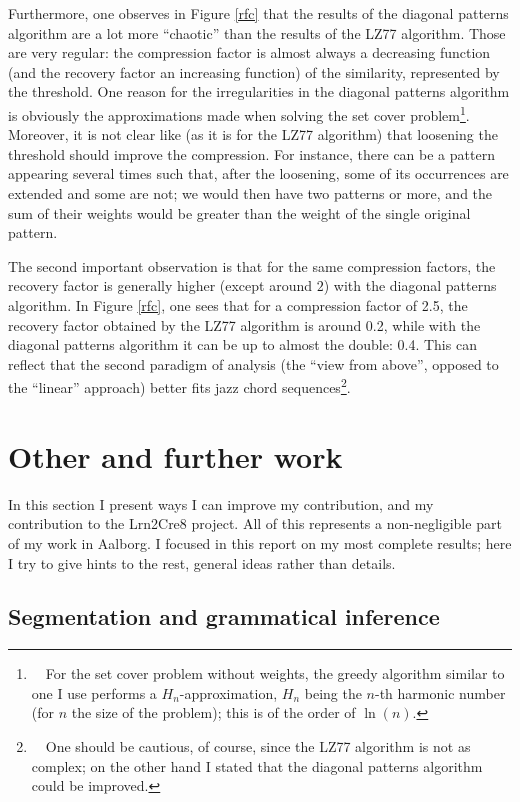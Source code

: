 \documentclass[a4paper,10pt]{article}
\newcommand{\guill}[1]{“#1”}
\begin{document}
Furthermore, one observes in Figure \ref{rfc} that the results of the diagonal patterns algorithm are a lot more \guill{chaotic} than the results of the LZ77 algorithm. Those are very regular: the compression factor is almost always a decreasing function (and the recovery factor an increasing function) of the similarity, represented by the threshold. One reason for the irregularities in the diagonal patterns algorithm is obviously the approximations made when solving the set cover problem\footnote{~~For the set cover problem without weights, the greedy algorithm similar to one I use performs a $H_n$-approximation, $H_n$ being the $n$-th harmonic number (for $n$ the size of the problem); this is of the order of $\ln(n)$.}.
Moreover, it is not clear like (as it is for the LZ77 algorithm) that loosening the threshold should improve the compression. For instance, there can be a pattern appearing several times such that, after the loosening, some of its occurrences are extended and some are not; we would then have two patterns or more, and the sum of their weights would be greater than the weight of the single original pattern.

The second important observation is that for the same compression factors, the recovery factor is generally higher (except around $2$) with the diagonal patterns algorithm. In Figure \ref{rfc}, one sees that for a compression factor of 2.5, the recovery factor obtained by the LZ77 algorithm is around 0.2, while with the diagonal patterns algorithm it can be up to almost the double: 0.4. This can reflect that the second paradigm of analysis (the \guill{view from above}, opposed to the \guill{linear} approach) better fits jazz chord sequences\footnote{~~One should be cautious, of course, since the LZ77 algorithm is not as complex; on the other hand I stated that the diagonal patterns algorithm could be improved.}.



\newpage
\section{Other and further work}

In this section I present ways I can improve my contribution, and my contribution to the Lrn2Cre8 project. All of this represents a non-negligible part of my work in Aalborg. I focused in this report on my most complete results; here I try to give hints to the rest, general ideas rather than details.


\subsection{Segmentation and grammatical inference}
\end{document}
